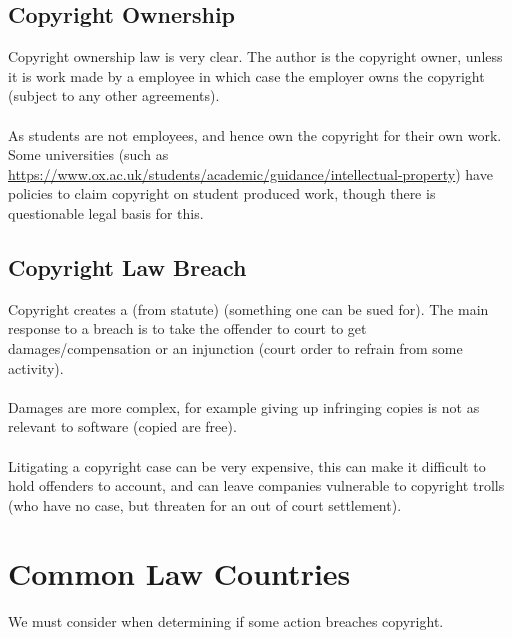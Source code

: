 \documentclass{report}
\begin{document}
\subsection*{Copyright Ownership}
Copyright ownership law is very clear. The author is the copyright owner, unless it is work made by a employee in which case the employer owns the copyright (subject to any other agreements).
\\
\\ As students are not employees, and hence own the copyright for their own work. Some universities (such as \href{Oxford}{https://www.ox.ac.uk/students/academic/guidance/intellectual-property}) have policies to claim copyright on student produced work, though there is questionable legal basis for this.

\subsection*{Copyright Law Breach}
Copyright creates a  (from statute)  (something one can be sued for). The main response to a breach is to take the offender to court to get damages/compensation or an injunction (court order to refrain from some activity).
\\
\\ Damages are more complex, for example giving up infringing copies is not as relevant to software (copied are free).
\\
\\ Litigating a copyright case can be very expensive, this can make it difficult to hold offenders to account, and can leave companies vulnerable to copyright trolls (who have no case, but threaten for an out of court settlement).

\section*{Common Law Countries}

We must consider  when determining if some action breaches copyright.


\unfinished
\end{document}
